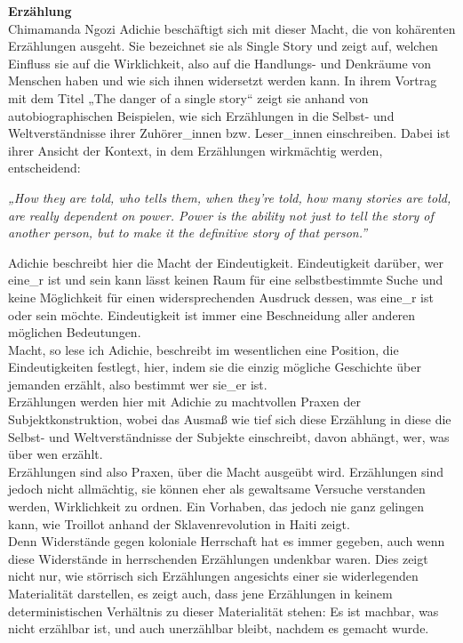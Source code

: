 \textbf{\large Erzählung}\\

Chimamanda Ngozi Adichie beschäftigt sich mit dieser Macht, die von kohärenten
Erzählungen ausgeht. Sie bezeichnet sie als Single Story und zeigt auf, welchen
Einfluss sie auf die Wirklichkeit, also auf die Handlungs- und Denkräume von
Menschen haben und wie sich ihnen widersetzt werden kann. In ihrem Vortrag mit
dem Titel „The danger of a single story“ zeigt sie anhand von
autobiographischen Beispielen, wie sich Erzählungen in die Selbst- und
Weltverständnisse ihrer Zuhörer\_innen bzw. Leser\_innen einschreiben. Dabei ist
ihrer Ansicht der Kontext, in dem Erzählungen wirkmächtig werden, entscheidend:

\begin{myenv}
  \textit{„How they are told, who tells them, when they're told, how many
stories are told, are really dependent on power. Power is the ability not just
to tell the story of another person, but to make it the definitive story of
that person.”\footnotemark{} } 
\end{myenv}
Adichie beschreibt hier die Macht der Eindeutigkeit. Eindeutigkeit darüber, wer
eine\_r ist und sein kann lässt keinen Raum für eine selbstbestimmte Suche und
keine Möglichkeit für einen widersprechenden Ausdruck dessen, was eine\_r ist oder
sein möchte. Eindeutigkeit ist immer eine Beschneidung aller anderen möglichen
Bedeutungen.\\
Macht, so lese ich Adichie, beschreibt im wesentlichen eine
Position, die Eindeutigkeiten festlegt, hier, indem sie die einzig mögliche
Geschichte über jemanden erzählt, also bestimmt wer sie\_er ist.\\

Erzählungen werden hier mit Adichie zu machtvollen Praxen der
Subjektkonstruktion, wobei das Ausmaß wie tief sich diese Erzählung in diese
die Selbst- und Weltverständnisse der Subjekte einschreibt, davon abhängt, wer,
was über wen erzählt.\\
Erzählungen sind also Praxen, über die Macht ausgeübt wird. Erzählungen sind
jedoch nicht allmächtig, sie können eher als gewaltsame Versuche verstanden
werden, Wirklichkeit zu ordnen. Ein Vorhaben, das jedoch nie ganz gelingen
kann, wie Troillot anhand der Sklavenrevolution in Haiti zeigt.\\
Denn Widerstände gegen koloniale Herrschaft hat es immer gegeben, auch wenn diese
Widerstände in  herrschenden Erzählungen undenkbar waren. Dies zeigt nicht nur,
wie störrisch sich Erzählungen angesichts einer sie widerlegenden Materialität
darstellen, es zeigt auch, dass jene Erzählungen in keinem deterministischen
Verhältnis zu dieser Materialität stehen: Es ist machbar, was nicht erzählbar
ist, und auch unerzählbar bleibt, nachdem es gemacht wurde.\\

